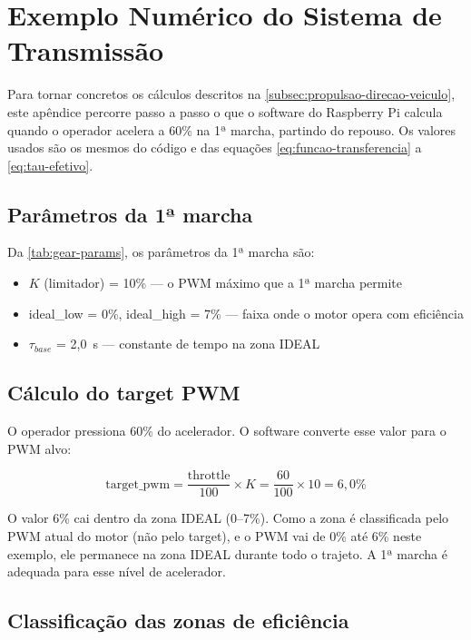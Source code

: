 \chapter{Exemplo Numérico do Sistema de Transmissão}
\label{apendice:exemplo-transmissao}

Para tornar concretos os cálculos descritos na \autoref{subsec:propulsao-direcao-veiculo}, este apêndice percorre passo a passo o que o software do Raspberry Pi calcula quando o operador acelera a 60\% na 1ª marcha, partindo do repouso. Os valores usados são os mesmos do código e das equações \autoref{eq:funcao-transferencia} a \autoref{eq:tau-efetivo}.

\section*{Parâmetros da 1ª marcha}

Da \autoref{tab:gear-params}, os parâmetros da 1ª marcha são:

\begin{itemize}
	\item $K$ (limitador) = 10\% --- o PWM máximo que a 1ª marcha permite
	\item ideal\_low = 0\%, ideal\_high = 7\% --- faixa onde o motor opera com eficiência
	\item $\tau_{base}$ = 2,0~s --- constante de tempo na zona IDEAL
\end{itemize}

\section*{Cálculo do target PWM}

O operador pressiona 60\% do acelerador. O software converte esse valor para o PWM alvo:

\begin{equation*}
	\text{target\_pwm} = \frac{\text{throttle}}{100} \times K = \frac{60}{100} \times 10 = 6{,}0\%
\end{equation*}

O valor 6\% cai dentro da zona IDEAL (0--7\%). Como a zona é classificada pelo PWM atual do motor (não pelo target), e o PWM vai de 0\% até 6\% neste exemplo, ele permanece na zona IDEAL durante todo o trajeto. A 1ª marcha é adequada para esse nível de acelerador.

\section*{Classificação das zonas de eficiência}

